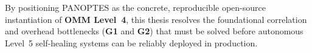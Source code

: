 By positioning PANOPTES as the concrete, reproducible open-source instantiation of \textbf{OMM Level~4}, this thesis resolves the foundational correlation and overhead bottlenecks (\textbf{G1} and \textbf{G2}) that must be solved before autonomous Level~5 self-healing systems can be reliably deployed in production.
